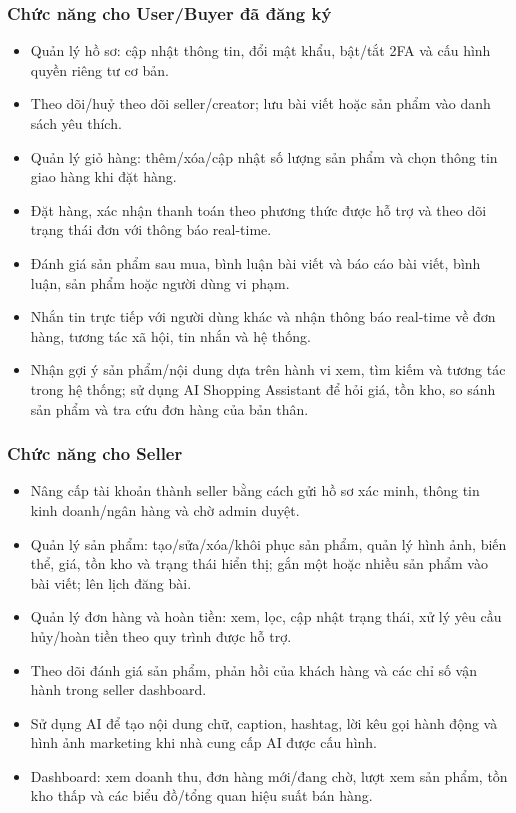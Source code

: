 \subsubsection{Chức năng cho User/Buyer đã đăng ký}
\begin{itemize}
    \item Quản lý hồ sơ: cập nhật thông tin, đổi mật khẩu, bật/tắt 2FA và cấu hình quyền riêng tư cơ bản.
    \item Theo dõi/huỷ theo dõi seller/creator; lưu bài viết hoặc sản phẩm vào danh sách yêu thích.
    \item Quản lý giỏ hàng: thêm/xóa/cập nhật số lượng sản phẩm và chọn thông tin giao hàng khi đặt hàng.
    \item Đặt hàng, xác nhận thanh toán theo phương thức được hỗ trợ và theo dõi trạng thái đơn với thông báo real-time.
    \item Đánh giá sản phẩm sau mua, bình luận bài viết và báo cáo bài viết, bình luận, sản phẩm hoặc người dùng vi phạm.
    \item Nhắn tin trực tiếp với người dùng khác và nhận thông báo real-time về đơn hàng, tương tác xã hội, tin nhắn và hệ thống.
    \item Nhận gợi ý sản phẩm/nội dung dựa trên hành vi xem, tìm kiếm và tương tác trong hệ thống; sử dụng AI Shopping Assistant để hỏi giá, tồn kho, so sánh sản phẩm và tra cứu đơn hàng của bản thân.
\end{itemize}

\subsubsection{Chức năng cho Seller}
\begin{itemize}
    \item Nâng cấp tài khoản thành seller bằng cách gửi hồ sơ xác minh, thông tin kinh doanh/ngân hàng và chờ admin duyệt.
    \item Quản lý sản phẩm: tạo/sửa/xóa/khôi phục sản phẩm, quản lý hình ảnh, biến thể, giá, tồn kho và trạng thái hiển thị; gắn một hoặc nhiều sản phẩm vào bài viết; lên lịch đăng bài.
    \item Quản lý đơn hàng và hoàn tiền: xem, lọc, cập nhật trạng thái, xử lý yêu cầu hủy/hoàn tiền theo quy trình được hỗ trợ.
    \item Theo dõi đánh giá sản phẩm, phản hồi của khách hàng và các chỉ số vận hành trong seller dashboard.
    \item Sử dụng AI để tạo nội dung chữ, caption, hashtag, lời kêu gọi hành động và hình ảnh marketing khi nhà cung cấp AI được cấu hình.
    \item Dashboard: xem doanh thu, đơn hàng mới/đang chờ, lượt xem sản phẩm, tồn kho thấp và các biểu đồ/tổng quan hiệu suất bán hàng.
\end{itemize}

